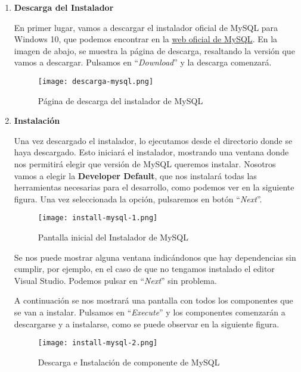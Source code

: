 \begin{enumerate}
    \item \textbf{Descarga del Instalador}

    En primer lugar, vamos a descargar el instalador oficial de MySQL para Windows 10, que podemos encontrar en la \href{https://dev.mysql.com/downloads/installer/}{web oficial de MySQL}. En la imagen de abajo, se muestra la página de descarga, resaltando la versión que vamos a descargar. Pulsamos en ``\textit{Download}'' y la descarga comenzará.

    \begin{figure}[ht]
        \centering
        \texttt{[image: descarga-mysql.png]}
        \caption{Página de descarga del instalador de MySQL}
    \end{figure}

    \item \textbf{Instalación}

    Una vez descargado el instalador, lo ejecutamos desde el directorio donde se haya descargado. Esto iniciará el instalador, mostrando una ventana donde nos permitirá elegir que versión de MySQL queremos instalar. Nosotros vamos a elegir la \textbf{Developer Default}, que nos instalará todas las herramientas necesarias para el desarrollo, como podemos ver en la siguiente figura. Una vez seleccionada la opción, pulsaremos en botón ``\textit{Next}''.

   \begin{figure}[ht]
        \centering
        \texttt{[image: install-mysql-1.png]}
        \caption{Pantalla inicial del Instalador de MySQL}
    \end{figure}

    Se nos puede mostrar alguna ventana indicándonos que hay dependencias sin cumplir, por ejemplo, en el caso de que no tengamos instalado el editor Visual Studio. Podemos pulsar en ``\textit{Next}'' sin problema.

    A continuación se nos mostrará una pantalla con todos los componentes que se van a instalar. Pulsamos en ``\textit{Execute}'' y los componentes comenzarán a descargarse y a instalarse, como se puede observar en la siguiente figura.

    \begin{figure}[ht]
        \centering
        \texttt{[image: install-mysql-2.png]}
        \caption{Descarga e Instalación de componente de MySQL}
    \end{figure}


\end{enumerate}
